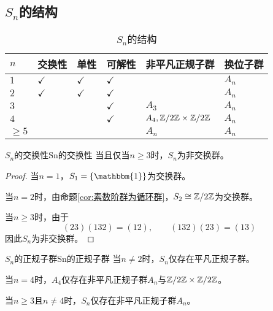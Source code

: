 \subsection{$S_n$的结构}

\begin{table}[H]
	\centering
	\caption{$S_n$的结构}
	\begin{tabular}{|>{\centering\arraybackslash}m{1cm}|>{\centering\arraybackslash}m{1.5cm}|>{\centering\arraybackslash}m{1cm}|>{\centering\arraybackslash}m{1.5cm}|>{\centering\arraybackslash}m{3cm}|>{\centering\arraybackslash}m{2cm}|}
		\hline
		$n$     & \textbf{交换性} & \textbf{单性} & \textbf{可解性}      & \textbf{非平凡正规子群} & \textbf{换位子群}    \\
		\hline
		$1$     & $\checkmark$    & $\checkmark$ & $\checkmark$         &                       & $A_n$    \\
		\hline
		$2$     & $\checkmark$    & $\checkmark$ & $\checkmark$         &                       & $A_n$    \\
		\hline
		$3$     &                 &              & $\checkmark$         &    $A_3$              & $A_n$    \\
		\hline
		$4$     &                 &              & $\checkmark$         & $A_4,\mathbb{Z}/2\mathbb{Z}\times\mathbb{Z}/2\mathbb{Z}$  & $A_n$ \\
		\hline
		$\ge 5$ &                 & &                      &    $A_n$              & $A_n$                \\   
		\hline
	\end{tabular}
\end{table}

\begin{proposition}{$S_n$的交换性}{Sn的交换性}
	当且仅当$n\ge 3$时，$S_n$为非交换群。
\end{proposition}

\begin{proof}
	当$n=1$，$S_1=\{\mathbbm{1}\}$为交换群。
	
	当$n=2$时，由命题\ref{cor:素数阶群为循环群}，$S_2\cong\mathbb{Z}/2\mathbb{Z}$为交换群。
	
	当$n\ge 3$时，由于
	$$
	(23)(132)=(12),\qquad 
	(132)(23)=(13)
	$$
	因此$S_n$为非交换群。
\end{proof}

\begin{proposition}{$S_n$的正规子群}{Sn的正规子群}
	当$n\ne 2$时，$S_n$仅存在平凡正规子群。
	
	当$n=4$时，$A_4$仅存在非平凡正规子群$A_n$与$\mathbb{Z}/2\mathbb{Z}\times\mathbb{Z}/2\mathbb{Z}$。
	
	当$n\ge 3$且$n\ne 4$时，$S_n$仅存在非平凡正规子群$A_n$。
\end{proposition}

